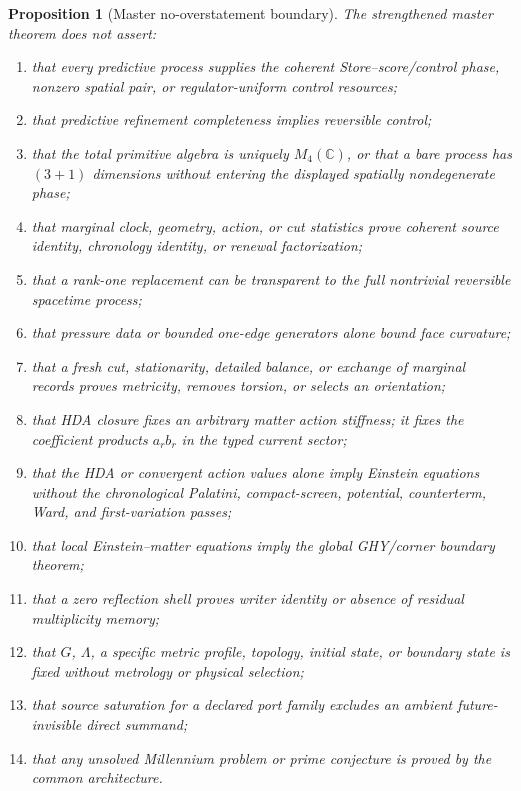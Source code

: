 \documentclass[11pt]{article}
\newtheorem{proposition}[theorem]{Proposition}
\theoremstyle{definition}
\theoremstyle{remark}
\newcommand{\C}{\mathbb C}
\begin{document}
\begin{proposition}[Master no-overstatement boundary]
\label{prop:master-no-overstatement}
The strengthened master theorem does not assert:
\begin{enumerate}[label=\textup{(\arabic*)},leftmargin=2.7em]
\item that every predictive process supplies the coherent Store--score/control
      phase, nonzero spatial pair, or regulator-uniform control resources;
\item that predictive refinement completeness implies reversible control;
\item that the total primitive algebra is uniquely \(M_4(\C)\), or that a
      bare process has \((3+1)\) dimensions without entering the displayed
      spatially nondegenerate phase;
\item that marginal clock, geometry, action, or cut statistics prove coherent
      source identity, chronology identity, or renewal factorization;
\item that a rank-one replacement can be transparent to the full nontrivial
      reversible spacetime process;
\item that pressure data or bounded one-edge generators alone bound face
      curvature;
\item that a fresh cut, stationarity, detailed balance, or exchange of marginal
      records proves metricity, removes torsion, or selects an orientation;
\item that HDA closure fixes an arbitrary matter action stiffness; it fixes the
      coefficient products \(a_rb_r\) in the typed current sector;
\item that the HDA or convergent action values alone imply Einstein equations
      without the chronological Palatini, compact-screen, potential,
      counterterm, Ward, and first-variation passes;
\item that local Einstein--matter equations imply the global GHY/corner
      boundary theorem;
\item that a zero reflection shell proves writer identity or absence of
      residual multiplicity memory;
\item that \(G\), \(\Lambda\), a specific metric profile, topology, initial
      state, or boundary state is fixed without metrology or physical
      selection;
\item that source saturation for a declared port family excludes an ambient
      future-invisible direct summand;
\item that any unsolved Millennium problem or prime conjecture is proved by the
      common architecture.
\end{enumerate}
\end{proposition}
\end{document}
